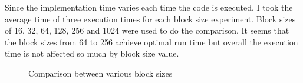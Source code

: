\documentclass{article}
\begin{document}
Since the implementation time varies each time the code is executed, I took the average time of three execution times for each block size experiment. Block sizes of 16, 32, 64, 128, 256 and 1024 were used to do the comparison. It seems that the block sizes from 64 to 256 achieve optimal run time but overall the execution time is not affected so much by block size value.

\begin{figure}[H]
    \caption{Comparison between various block sizes}
\end{figure}
\end{document}
